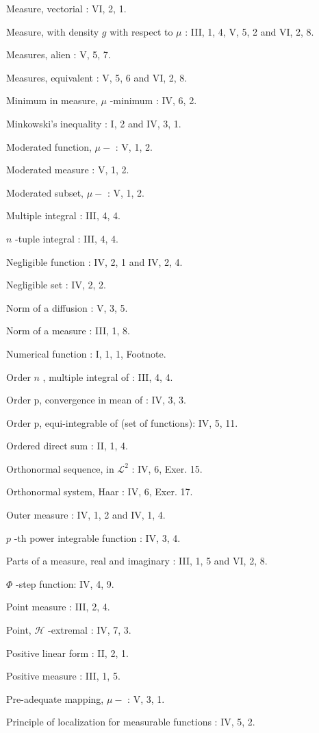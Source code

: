 Measure, vectorial : VI, 2, 1.

Measure, with density \(g\) with respect to \(\mu\) : III, 1, 4, V, 5, 2 and VI, 2, 8.

Measures, alien : V, 5, 7.

Measures, equivalent : V, 5, 6 and VI, 2, 8.

Minimum in measure, \(\mu\) -minimum : IV, 6, 2.

Minkowski's inequality : I, 2 and IV, 3, 1.

Moderated function, \(\mu-\) : V, 1, 2.

Moderated measure : V, 1, 2.

Moderated subset, \(\mu-\) : V, 1, 2.

Multiple integral : III, 4, 4.

\(n\) -tuple integral : III, 4, 4.

Negligible function : IV, 2, 1 and IV, 2, 4.

Negligible set : IV, 2, 2.

Norm of a diffusion : V, 3, 5.

Norm of a measure : III, 1, 8.

Numerical function : I, 1, 1, Footnote.

Order \(n\) , multiple integral of : III, 4, 4.

Order p, convergence in mean of : IV, 3, 3.

Order p, equi-integrable of (set of functions): IV, 5, 11.

Ordered direct sum : II, 1, 4.

Orthonormal sequence, in \(\mathcal{L}^2\) : IV, 6, Exer. 15.

Orthonormal system, Haar : IV, 6, Exer. 17.

Outer measure : IV, 1, 2 and IV, 1, 4.

\(p\) -th power integrable function : IV, 3, 4.

Parts of a measure, real and imaginary : III, 1, 5 and VI, 2, 8.

\(\Phi\) -step function: IV, 4, 9.

Point measure : III, 2, 4.

Point, \(\mathcal{H}\) -extremal : IV, 7, 3.

Positive linear form : II, 2, 1.

Positive measure : III, 1, 5.

Pre-adequate mapping, \(\mu-\) : V, 3, 1.

Principle of localization for measurable functions : IV, 5, 2.

